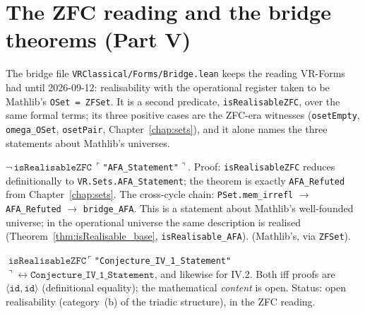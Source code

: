 \section{The ZFC reading and the bridge theorems (Part V)}
\label{sec:forms_bridge}

The bridge file \texttt{VRClassical/Forms/Bridge.lean} keeps the reading
VR-Forms had until 2026-09-12: realisability with the operational register
taken to be Mathlib's \texttt{OSet = ZFSet}.  It is a second predicate,
\texttt{isRealisableZFC}, over the same formal terms; its three positive
cases are the ZFC-era witnesses (\texttt{osetEmpty}, \texttt{omega\_OSet},
\texttt{osetPair}, Chapter~\ref{chap:sets}), and it alone names the three
statements about Mathlib's universes.

\begin{theorem}
\label{thm:bridge_AFA}
\leanok
{}
$\lnot\,\texttt{isRealisableZFC}\,\ulcorner$\texttt{"AFA\_Statement"}$\urcorner$.
Proof: \texttt{isRealisableZFC} reduces definitionally to
\texttt{VR.Sets.AFA\_Statement}; the theorem is exactly
\texttt{AFA\_Refuted} from Chapter~\ref{chap:sets}.  The cross-cycle chain:
\texttt{PSet.mem\_irrefl} $\to$ \texttt{AFA\_Refuted} $\to$
\texttt{bridge\_AFA}.  This is a statement about Mathlib's well-founded
universe; in the operational universe the same description is realised
(Theorem~\ref{thm:isRealisable_base}, \texttt{isRealisable\_AFA}).
 (Mathlib's, via \texttt{ZFSet}).
\end{theorem}

\begin{theorem}
\label{thm:bridge_Conjectures}
\leanok
{}
$\texttt{isRealisableZFC}\,\ulcorner$\texttt{"Conjecture\_IV\_1\_Statement"}$\urcorner
\leftrightarrow \texttt{Conjecture\_IV\_1\_Statement}$, and likewise for
IV.2.  Both iff proofs are $\langle\texttt{id},\texttt{id}\rangle$
(definitional equality); the mathematical \emph{content} is open.  Status:
open realisability (category~(b) of the triadic structure), in the ZFC
reading.
\end{theorem}

